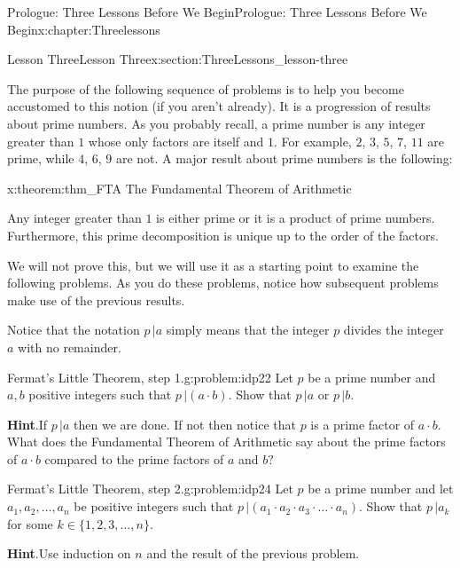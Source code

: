 \begin{chapterptx}{Prologue: Three Lessons Before We Begin}{}{Prologue: Three Lessons Before We Begin}{}{}{x:chapter:Threelessons}
\begin{sectionptx}{Lesson Three}{}{Lesson Three}{}{}{x:section:ThreeLessons_lesson-three}
		\par
		The purpose of the following sequence of problems is to help you become accustomed to this notion (if you aren't already). It is a progression of results about prime numbers. As you probably recall, a prime number is any integer greater than \(1\) whose only factors are itself and \(1\). For example, \(2\), \(3\), \(5\), \(7\), \(11\) are prime, while \(4\), \(6\), \(9\) are not. A major result about prime numbers is the following:%
		\begin{theorem}{}{}{x:theorem:thm_FTA}%
			\alert{The Fundamental Theorem of Arithmetic}%
			\par
			Any integer greater than \(1\) is either prime or it is a product of prime numbers. Furthermore, this prime decomposition is unique up to the order of the factors.%
		\end{theorem}
		We will not prove this, but we will use it as a starting point to examine the following problems. As you do these problems, notice how subsequent problems make use of the previous results.%
		\par
		Notice that the notation \(p\,|a\) simply means that the integer \(p\) divides the integer \(a\) with no remainder.%
		\begin{problem}{Fermat's Little Theorem, step 1.}{g:problem:idp22}%
			 Let \(p\) be a prime number and \(a, b\) positive integers such that \(p\, | (a\cdot b)\). Show that \(p\,|a\) or \(p\,|b\).%
			\par\smallskip%
			\noindent\textbf{\blocktitlefont Hint}.\hypertarget{g:hint:idp23}{}\quad{}If \(p\,|a\) then we are done. If not then notice that \(p\) is a prime factor of \(a\cdot b\). What does the Fundamental Theorem of Arithmetic say about the prime factors of \(a\cdot b\) compared to the prime factors of \(a\) and \(b?\)%
		\end{problem}
		\begin{problem}{Fermat's Little Theorem, step 2.}{g:problem:idp24}%
			 Let \(p\) be a prime number and let \(a_1, a_2, \ldots,
			a_n\) be positive integers such that \(p\,|\left(a_1\cdot
			a_2\cdot a_3\cdot\ldots\cdot a_n\right)\).  Show that \(p\,|a_k\) for some \(k\in\{1, 2, 3, \ldots, n\}\).%
			\par\smallskip%
			\noindent\textbf{\blocktitlefont Hint}.\hypertarget{g:hint:idp25}{}\quad{}Use induction on \(n\) and the result of the previous problem.%

\end{problem}
\end{sectionptx}
\end{chapterptx}
